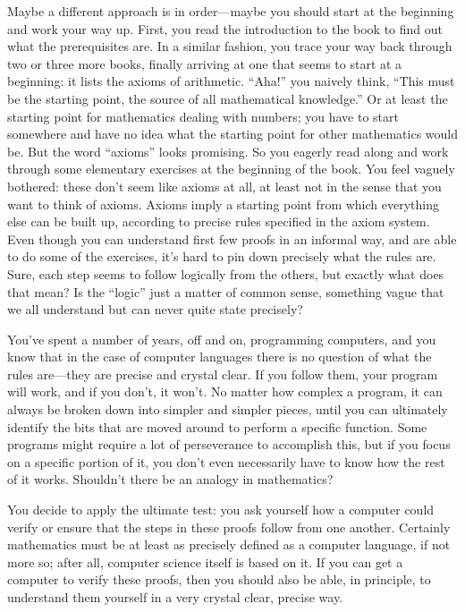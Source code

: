 Maybe a different approach is in order---maybe you should start at the
beginning and work your way up.  First, you read the introduction to the book
to find out what the prerequisites are.  In a similar fashion, you trace your
way back through two or three more books, finally arriving at one that seems
to start at a beginning:  it lists the axioms of arithmetic.  ``Aha!'' you
naively think, ``This must be the starting point, the source of all mathematical
knowledge.'' Or at least the starting point for mathematics dealing with
numbers; you have to start somewhere and have no idea what the starting point
for other mathematics would be.  But the word ``axioms'' looks promising.  So
you eagerly read along and work through some elementary exercises at the
beginning of the book.  You feel vaguely bothered:  these
don't seem like axioms at all, at least not in the sense that you want to
think of axioms.  Axioms imply a starting point from which everything else can
be built up, according to precise rules specified in the axiom system.  Even
though you can understand first few proofs in an informal way,
and are able to do some of the
exercises, it's hard to pin down precisely what the
rules are.   Sure, each step seems to follow logically from the others, but
exactly what does that mean?  Is the ``logic'' just a matter of common sense,
something vague that we all understand but can never quite state precisely?

You've spent a number of years, off and on, programming computers, and you
know that in the case of computer languages there is no question of what the
rules are---they are precise and crystal clear.  If you follow them, your
program will work, and if you don't, it won't.  No matter how complex a
program, it can always be broken down into simpler and simpler pieces, until
you can ultimately identify the bits that are moved around to perform a
specific function.  Some programs might require a lot of perseverance to
accomplish this, but if you focus on a specific portion of it, you don't even
necessarily have to know how the rest of it works. Shouldn't there be an
analogy in mathematics?

You decide to apply the ultimate test:  you ask yourself how a computer could
verify or ensure that the steps in these proofs follow from one another.
Certainly mathematics must be at least as precisely defined as a computer
language, if not more so; after all, computer science itself is based on it.
If you can get a computer to verify these proofs, then you should also be
able, in principle, to understand them yourself in a very crystal clear,
precise way.

